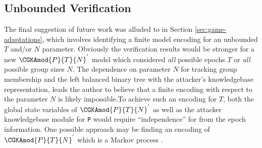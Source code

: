 \hypertarget{unbounded-verification}{%
\subsection{Unbounded Verification}\label{unbounded-verification}}

The final suggestion of future work was alluded to in Section \ref{sec:game-adaptations}, which involves identifying a finite model encoding for an unbounded \(T\) and/or \(N\) parameter.
Obviously the verification results would be stronger for a new \( \CGKAmod{P}{T}{N}^{'} \) model which considered \emph{all} possible epochs \(T\) or \emph{all} possible group sizes \(N\).
The dependence on parameter \(N\) for tracking group membership and the left balanced binary tree with the attacker's knowledgebase representation, leads the author to believe that a finite encoding with respect to the parameter \(N\) is likely impossible.To achieve such an encoding for \(T\), both the global state variables of \( \CGKAmod{P}{T}{N}^{'} \) as well as the attacker knowledgebase module for \texttt{P} would require ``independence'' for from the epoch information.
One possible approach may be finding an encoding of \( \CGKAmod{P}{T}{N}^{'} \) which is a Markov process \autocite{markov1906a}.
